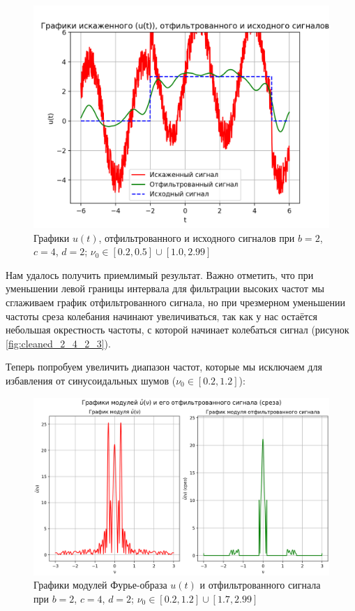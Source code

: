 \begin{figure}[ht!]
    \centering
    \includegraphics[scale=0.65]{media/1 task/specific_freq/Cleaned_2_4_2_-0,5_-0,2_-2,99_-1,0.png}
    \caption{Графики  $u(t)$, отфильтрованного и исходного сигналов при $b=2$, $c=4$, $d=2$; $\nu_0 \in [0.2, 0.5] \cup [1.0, 2.99]$}
    \label{fig:cleaned_2_4_2_2}
\end{figure}

\clearpage

Нам удалось получить приемлимый результат. Важно отметить, что при уменьшении левой границы интервала для фильтрации высоких частот мы сглаживаем график отфильтрованного сигнала, но при чрезмерном уменьшении частоты среза колебания начинают увеличиваться, так как у нас остаётся небольшая окрестность частоты, с которой начинает колебаться сигнал (рисунок \ref{fig:cleaned_2_4_2_3}).

Теперь попробуем увеличить диапазон частот, которые мы исключаем для избавления от синусоидальных шумов ($\nu_0 \in [0.2, 1.2]$):

\vfill

\begin{figure}[ht!]
    \centering
    \includegraphics[scale=0.55]{media/1 task/specific_freq/Fourier_Image_2_4_2_-1,2_-0,2_-2,99_-2,7_-2,7_-1,7.png}
    \caption{Графики модулей Фурье-образа $u(t)$ и отфильтрованного сигнала при $b=2$, $c=4$, $d=2$; $\nu_0 \in [0.2, 1.2] \cup [1.7, 2.99]$}
    \label{fig:four_2_4_2_4}
\end{figure}

